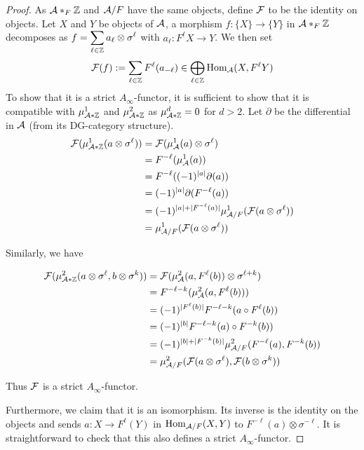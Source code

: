 \documentclass[12pt]{article}
\begin{document}
	\begin{proof}
		As ${\cal{A}} *_F \mathbb{Z}$ and ${\cal{A}}/F$ have the same objects, define ${\cal{F}}$ to be the identity on objects. Let $X$ and $Y$ be objects of ${\cal{A}}$, a morphism $f: \{X\} \to \{Y\}$ in ${\cal{A}} *_F \mathbb{Z}$ decomposes as $f = \displaystyle\sum_{\ell \in \mathbb{Z}} a_\ell \otimes \sigma^\ell$ with $a_\ell: F^\ell X \to Y$. We then set
		\[{\cal{F}}(f):= \sum_{\ell \in \mathbb{Z}} F^{\ell}(a_{-\ell}) \in \bigoplus_{\ell \in \mathbb{Z}} \textup{Hom}_{\cal{A}}(X,F^\ell Y)\]
		To show that it is a strict $A_\infty$-functor, it is sufficient to show that it is compatible with $\mu^1_{{\cal{A}} * \mathbb{Z}}$ and $\mu^2_{{\cal{A}} * \mathbb{Z}}$ as $\mu^d_{{\cal{A}} * \mathbb{Z}}=0$ for $d > 2$. Let $\partial$ be the differential in ${\cal{A}}$ (from its DG-category structure).
		\begin{align*}
			{\cal{F}}(\mu^1_{{\cal{A}} * \mathbb{Z}}(a \otimes \sigma^\ell)) &= {\cal{F}}(\mu^1_{\cal{A}}(a) \otimes \sigma^\ell) \\
			&= F^{-\ell}(\mu^1_{\cal{A}}(a)) \\
			&= F^{-\ell}((-1)^{|a|}\partial(a)) \\
			&= (-1)^{|a|}\partial(F^{-\ell}(a))\\
			&= (-1)^{|a| + |F^{-\ell}(a)|} \mu^1_{{\cal{A}}/F}({\cal{F}}(a \otimes \sigma^\ell)) \\
			&= \mu^1_{{\cal{A}}/F}({\cal{F}}(a \otimes \sigma^\ell))
		\end{align*}
		
		\noindent Similarly, we have
		
		\begin{align*}
			{\cal{F}}(\mu^2_{{\cal{A}} * \mathbb{Z}}(a \otimes \sigma^\ell, b \otimes \sigma^k)) &= {\cal{F}}(\mu^2_{\cal{A}}(a,F^\ell(b)) \otimes \sigma^{\ell+k}) \\
			&= F^{-\ell-k}(\mu^2_{\cal{A}}(a,F^{\ell}(b))) \\
			&= (-1)^{|F^\ell(b)|} F^{-\ell-k}(a \circ F^{\ell}(b)) \\
			&= (-1)^{|b|} F^{-\ell-k}(a) \circ F^{-k}(b)) \\
			&= (-1)^{|b|+|F^{-k}(b)|}\mu^2_{{\cal{A}}/F}(F^{-\ell}(a),F^{-k}(b)) \\
			&= \mu^2_{{\cal{A}}/F}({\cal{F}}(a \otimes \sigma^\ell),{\cal{F}}(b \otimes \sigma^k))
		\end{align*}
		
		\noindent Thus ${\cal{F}}$ is a strict $A_\infty$-functor. 
		
		\noindent Furthermore, we claim that it is an isomorphism. Its inverse is the identity on the objects and sends $a: X \to F^\ell(Y)$ in $\textup{Hom}_{{\cal{A}}/F}(X,Y)$ to $F^{-\ell}(a) \otimes \sigma^{-\ell}$. It is straightforward to check that this also defines a strict $A_\infty$-functor.
	\end{proof}
	
\end{document}
